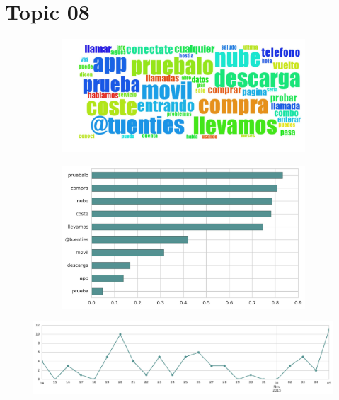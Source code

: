 \section{Topic 08}

\begin{figure}[htbp!]
    \centering
    \begin{subfigure}[b]{0.49\textwidth}
        \includegraphics[width=\textwidth]{twitter_all/report_images/topic-08-wordcloud.jpg}
    \end{subfigure}
    \begin{subfigure}[b]{0.49\textwidth}
        \includegraphics[width=\textwidth]{twitter_all/report_images/topic-08-terms.jpg}
    \end{subfigure}
\end{figure}

\begin{figure}[htbp!]
    \centering
    \includegraphics[width=\textwidth]{twitter_all/report_images/topic-08-timeseries.jpg}
\end{figure}

